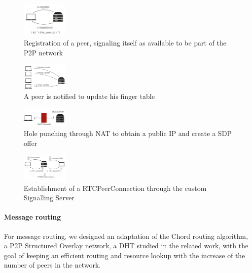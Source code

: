 \begin{figure}[h!]
  \centering
  \includegraphics[width=0.2\textwidth]{figs/1-peer-registers}
  \caption{Registration of a peer, signaling itself as available to be part of the P2P network}
  \label{fig:1-p-r}
\end{figure}

\begin{figure}[h!]
  \centering
  \includegraphics[width=0.2\textwidth]{figs/2-peers-notified}
  \caption{A peer is notified to update his finger table}
  \label{fig:2-p-n}
\end{figure}

\begin{figure}[h!]
  \centering
  \includegraphics[width=0.2\textwidth]{figs/3-peer-stun}
  \caption{Hole punching through NAT to obtain a public IP and create a SDP offer}
  \label{fig:3-p-s}
\end{figure}

\begin{figure}[h!]
  \centering
  \includegraphics[width=0.2\textwidth]{figs/4-peer-connect}
  \caption{Establishment of a RTCPeerConnection through the custom Signalling Server}
  \label{fig:4-p-c}
\end{figure}

\paragraph{Message routing}

For message routing, we designed an adaptation of the Chord routing algorithm, a P2P Structured Overlay network, a DHT studied in the related work, with the goal of keeping an efficient routing and resource lookup with the increase of the number of peers in the network.

